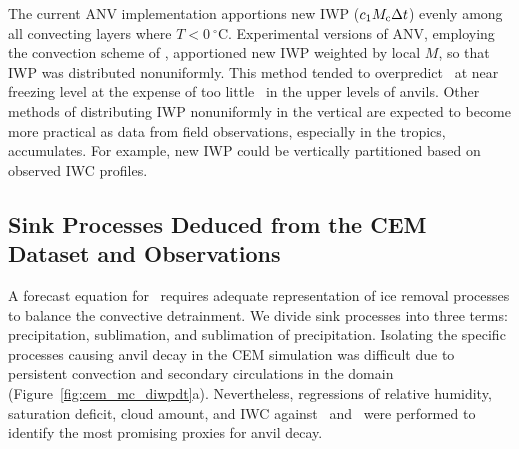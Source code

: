\documentclass[twoside,agums]{aguplus}
\begin{document}
The current ANV implementation apportions new IWP ($c_1\mbox{$M_\mathrm{c}$}\Delta t$)
evenly among all convecting layers where $T < 0~^\circ$C.
Experimental versions of ANV, employing the convection scheme of
\cite{Hac94}, apportioned new IWP weighted by local $M$, so that
IWP was distributed nonuniformly.
This method tended to overpredict \qi\ at near freezing level at the
expense of too little \qi\ in the upper levels of anvils.
Other methods of distributing IWP nonuniformly in the vertical are
expected to become more practical as data from field observations,
especially in the tropics, accumulates.
For example, new IWP could be vertically partitioned based on observed
IWC profiles.

\subsection{Sink Processes Deduced from the CEM Dataset and
Observations} 

A forecast equation for \qi\ requires adequate representation of ice 
removal processes to balance the convective detrainment.
We divide sink processes into three terms: precipitation, sublimation,
and sublimation of precipitation. 
Isolating the specific processes causing anvil decay in the CEM
simulation was difficult due to persistent convection and secondary
circulations in the domain (Figure~\ref{fig:cem_mc_diwpdt}a). 
Nevertheless, regressions of relative humidity, saturation deficit,
cloud amount, and IWC against \IWPdot\ and \IWCdot\ were performed
to identify the most promising proxies for anvil decay. 
\end{document}
